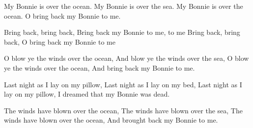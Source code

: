 \beginverse
My Bonnie is over the ocean.
My Bonnie is over the sea.
My Bonnie is over the ocean.
O bring back my Bonnie to me.
\endverse

\beginchorus
Bring back, bring back,
Bring back my Bonnie to me, to me
Bring back, bring back,
O bring back my Bonnie to me
\endchorus

\beginverse
O blow ye the winds over the ocean,
And blow ye the winds over the sea,
O blow ye the winds over the ocean,
And bring back my Bonnie to me.
\endverse

\beginverse
Last night as I lay on my pillow,
Last night as I lay on my bed,
Last night as I lay on my pillow,
I dreamed that my Bonnie was dead.
\endverse

\beginverse
The winds have blown over the ocean,
The winds have blown over the sea,
The winds have blown over the ocean,
And brought back my Bonnie to me.
\endverse

\endsong